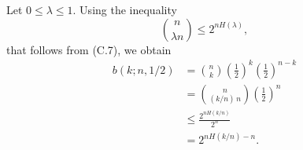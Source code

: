 Let $0\le\lambda\le1$.
Using the inequality
\[
    \binom{n}{\lambda n} \le 2^{nH(\lambda)},
\]
that follows from (C.7), we obtain
\begin{align*}
    b(k;n,1/2) &= \binom{n}{k}\left(\frac{1}{2}\right)^k\left(\frac{1}{2}\right)^{n-k} \\
    &= \binom{n}{(k/n)\,n}\left(\frac{1}{2}\right)^n \\
    &\le \frac{2^{nH(k/n)}}{2^n} \\[1mm]
    &= 2^{nH(k/n)-n}.
\end{align*}
